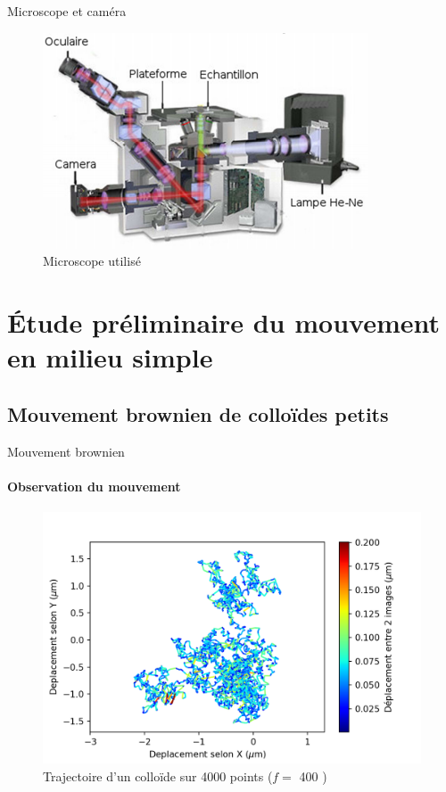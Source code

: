 \documentclass[11pt]{beamer}
\begin{document}
\begin{frame}{Microscope et caméra}
	\begin{figure}
    	\centering
    	\includegraphics[width=0.8\linewidth]{microscope.png}
    	\caption{Microscope utilisé}
    	\label{fig:microscope}
	\end{figure}

\end{frame}

\section{Étude préliminaire du mouvement en milieu simple}


\subsection{Mouvement brownien de colloïdes petits}

\begin{frame}{Mouvement brownien}
\framesubtitle{Observation du mouvement}
	\begin{figure}
		\centering
		\includegraphics[width=0.9\linewidth]{Trajectory_brownian}
		\caption{Trajectoire d'un colloïde sur 4000 points ($f=$ 400 \hertz)}
		\label{fig:trajectory_b}
	\end{figure}
\end{frame}
\end{document}
